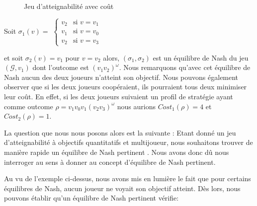 \begin{figure}[ht!]
	\centering

	
	\caption{Jeu d'atteignabilité avec coût}
	\label{ex:patologique}
	

\end{figure}

Soit $\sigma _{1}(v) =$ $\begin{cases}
						v_{2} & \text{si } v = v_{1} \\
						v_{1 } & \text{si } v = v_{0} \\
						v_{2} & \text{si } v = v_{3} 
						\end{cases}$
						
						
						
\noindent et soit $\sigma _{2}(v) = v_{1}$ pour $v = v_2$ alors, $(\sigma _{1},\sigma _{2})$ est un équilibre de Nash du jeu $(\mathcal{G},v_{1})$ dont l'outcome est $(v_{1}v_{2})^{\omega}$. Nous remarquons qu'avec cet équilibre de Nash aucun des deux joueurs n'atteint son objectif. Nous pouvons également observer que si les deux joueurs coopéraient, ils pourraient tous deux minimiser leur coût. En effet, si les deux joueurs suivaient un profil de stratégie ayant comme outcome $\rho = v_{1}v_{0}v_{1}(v_{2}v_{3})^{\omega} $ nous aurions $Cost_{1}(\rho) = 4$ et $Cost_{2}(\rho) = 1$.

La question que nous nous posons alors est la suivante : \og Etant donné un jeu d'atteignabilité à objectifs quantitatifs et multijoueur, nous souhaitons trouver de manière rapide un équilibre de Nash pertinent \fg. Nous avons donc dû nous interroger au sens à donner au concept d'équilibre de Nash pertinent.

Au vu de l'exemple ci-dessus, nous avons mis en lumière le fait que pour certains équilibres de Nash, aucun joueur ne voyait son objectif atteint. Dès lors, nous pouvons établir qu'un équilibre de Nash pertinent vérifie:

